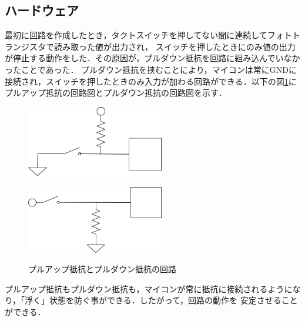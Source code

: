 \documentclass[a4paper,11pt]{jsarticle}
\begin{document}
\subsection{ハードウェア}
最初に回路を作成したとき，タクトスイッチを押してない間に連続してフォトトランジスタで読み取った値が出力され，
スイッチを押したときにのみ値の出力が停止する動作をした．その原因が，プルダウン抵抗を回路に組み込んでいなかったことであった．
プルダウン抵抗を挟むことにより，マイコンは常にGNDに接続され，スイッチを押したときのみ入力が加わる回路ができる．以下の図\ref{pull}に
プルアップ抵抗の回路図とプルダウン抵抗の回路図を示す．
\begin{figure}[H]
  \begin{minipage}{0.48\textwidth}
    \begin{center}
      \includegraphics[clip,width=6cm]{picture/up.png}
    \end{center}
    \label{P:pullup}
  \end{minipage}
  \begin{minipage}{0.48\textwidth}
    \begin{center}
      \includegraphics[clip,width=6cm]{picture/down.png}
    \end{center}
    \label{P:pulldown}
  \end{minipage}
  \caption{プルアップ抵抗とプルダウン抵抗の回路}
  \label{pull}
\end{figure}
プルアップ抵抗もプルダウン抵抗も，マイコンが常に抵抗に接続されるようになり，「浮く」状態を防ぐ事ができる．したがって，回路の動作を
安定させることができる．
\end{document}
